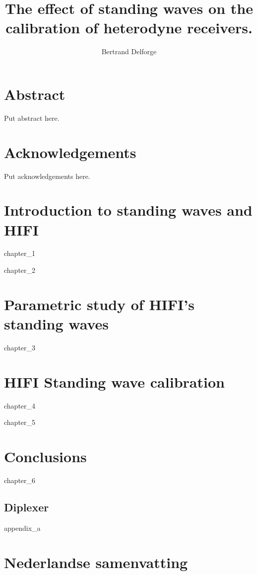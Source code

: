 \documentclass[a4paper,11pt]{book}
\title{The effect of standing waves on the calibration of heterodyne receivers.}
\author{Bertrand Delforge}
\begin{document}
\frontmatter
\maketitle
\tableofcontents
\newpage

\listoffigures
\listofalgorithms
\newpage

\clearpage
\chapter{Abstract}
Put abstract here.

\clearpage
\chapter{Acknowledgements}
Put acknowledgements here.
\mainmatter

\cleardoublepage
\chapter{Introduction to standing waves and HIFI}
{chapter_1}

\cleardoublepage
{chapter_2}

\cleardoublepage
\chapter{Parametric study of HIFI's standing waves}
{chapter_3}

\cleardoublepage
\chapter{HIFI Standing wave calibration}
{chapter_4}

\cleardoublepage
{chapter_5}

\cleardoublepage
\chapter{Conclusions}
{chapter_6}

\begin{appendices}
\chapter{Diplexer}
{appendix_a}
\end{appendices}

\backmatter

\cleardoublepage
\chapter{Nederlandse samenvatting}


\cleardoublepage
{}
\printindex

\cleardoublepage
{}
%
\printbibliography
\end{document}
